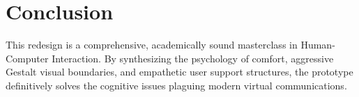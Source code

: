 \documentclass[12pt,a4paper]{article}
\begin{document}
\section{Conclusion}

This redesign is a comprehensive, academically sound masterclass in Human-Computer Interaction. By synthesizing the psychology of comfort, aggressive Gestalt visual boundaries, and empathetic user support structures, the prototype definitively solves the cognitive issues plaguing modern virtual communications.
\end{document}

